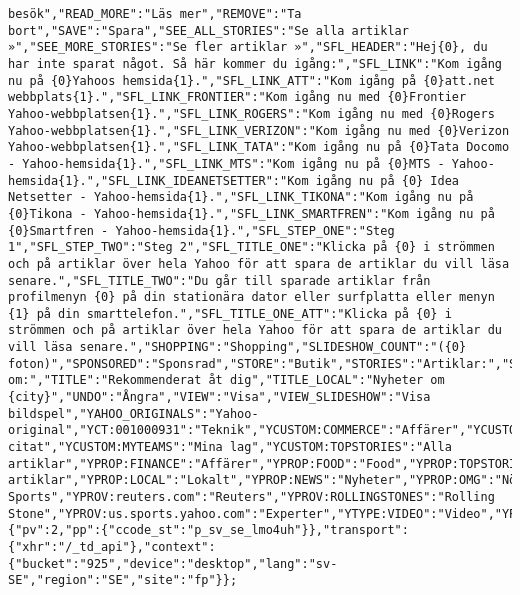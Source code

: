 \begin{verbatim}
besök","READ_MORE":"Läs mer","REMOVE":"Ta bort","SAVE":"Spara","SEE_ALL_STORIES":"Se alla artiklar »","SEE_MORE_STORIES":"Se fler artiklar »","SFL_HEADER":"Hej{0}, du har inte sparat något. Så här kommer du igång:","SFL_LINK":"Kom igång nu på {0}Yahoos hemsida{1}.","SFL_LINK_ATT":"Kom igång på {0}att.net webbplats{1}.","SFL_LINK_FRONTIER":"Kom igång nu med {0}Frontier Yahoo-webbplatsen{1}.","SFL_LINK_ROGERS":"Kom igång nu med {0}Rogers Yahoo-webbplatsen{1}.","SFL_LINK_VERIZON":"Kom igång nu med {0}Verizon Yahoo-webbplatsen{1}.","SFL_LINK_TATA":"Kom igång nu på {0}Tata Docomo - Yahoo-hemsida{1}.","SFL_LINK_MTS":"Kom igång nu på {0}MTS - Yahoo-hemsida{1}.","SFL_LINK_IDEANETSETTER":"Kom igång nu på {0} Idea Netsetter - Yahoo-hemsida{1}.","SFL_LINK_TIKONA":"Kom igång nu på {0}Tikona - Yahoo-hemsida{1}.","SFL_LINK_SMARTFREN":"Kom igång nu på {0}Smartfren - Yahoo-hemsida{1}.","SFL_STEP_ONE":"Steg 1","SFL_STEP_TWO":"Steg 2","SFL_TITLE_ONE":"Klicka på {0} i strömmen och på artiklar över hela Yahoo för att spara de artiklar du vill läsa senare.","SFL_TITLE_TWO":"Du går till sparade artiklar från profilmenyn {0} på din stationära dator eller surfplatta eller menyn {1} på din smarttelefon.","SFL_TITLE_ONE_ATT":"Klicka på {0} i strömmen och på artiklar över hela Yahoo för att spara de artiklar du vill läsa senare.","SHOPPING":"Shopping","SLIDESHOW_COUNT":"({0} foton)","SPONSORED":"Sponsrad","STORE":"Butik","STORIES":"Artiklar:","STORIES_ABOUT":"Artiklar om:","TITLE":"Rekommenderat åt dig","TITLE_LOCAL":"Nyheter om {city}","UNDO":"Ångra","VIEW":"Visa","VIEW_SLIDESHOW":"Visa bildspel","YAHOO_ORIGINALS":"Yahoo-original","YCT:001000931":"Teknik","YCUSTOM:COMMERCE":"Affärer","YCUSTOM:MYQUOTES":"Mina citat","YCUSTOM:MYTEAMS":"Mina lag","YCUSTOM:TOPSTORIES":"Alla artiklar","YPROP:FINANCE":"Affärer","YPROP:FOOD":"Food","YPROP:TOPSTORIES":"Alla artiklar","YPROP:LOCAL":"Lokalt","YPROP:NEWS":"Nyheter","YPROP:OMG":"Nöje","YPROP:SCIENCE":"Vetenskap","YPROP:SPORTS":"Sport","YPROV:ABCNEWS":"Nyheter","YPROV:ap.org":"AP","YPROV:CNBC":"CNBC","YPROV:NBCSPORT":"NBC Sports","YPROV:reuters.com":"Reuters","YPROV:ROLLINGSTONES":"Rolling Stone","YPROV:us.sports.yahoo.com":"Experter","YTYPE:VIDEO":"Video","YPROP:KIMO":"Kimo","YPROP:STYLE":"Stil","YMAG:celebrity":"Celebrity","YMAG:food":"Mat","YMAG:hkstylemen":"Men","YMAG:hktravelnow":"Travel","YMAG:style":"Style","YMAG:tech":"Teknik"},"i13n":{"pv":2,"pp":{"ccode_st":"p_sv_se_lmo4uh"}},"transport":{"xhr":"/_td_api"},"context":{"bucket":"925","device":"desktop","lang":"sv-SE","region":"SE","site":"fp"}};

\end{verbatim}
